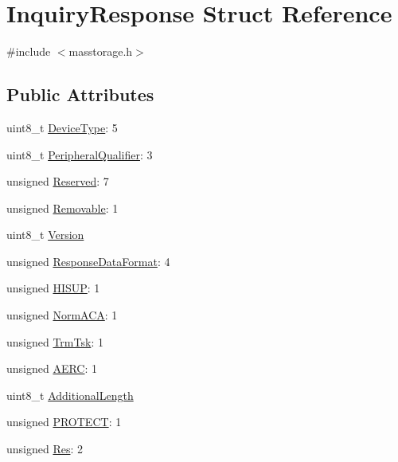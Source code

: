 \hypertarget{struct_inquiry_response}{\section{\-Inquiry\-Response \-Struct \-Reference}
\label{struct_inquiry_response}
}


{\ttfamily \#include $<$masstorage.\-h$>$}

\subsection*{\-Public \-Attributes}
\begin{DoxyCompactItemize}
\item 
uint8\-\_\-t \hyperlink{struct_inquiry_response_abc2af027a176dc85d4e83f14eec7972e}{\-Device\-Type}\-: 5
\item 
uint8\-\_\-t \hyperlink{struct_inquiry_response_a8e8f2cb6b5a0d1ed2c300155bf2b3faa}{\-Peripheral\-Qualifier}\-: 3
\item 
unsigned \hyperlink{struct_inquiry_response_abb4a48d4fc326ad932fb41c82fe289f3}{\-Reserved}\-: 7
\item 
unsigned \hyperlink{struct_inquiry_response_ab6572ef8e5cd457e0699095f6a0c7a3d}{\-Removable}\-: 1
\item 
uint8\-\_\-t \hyperlink{struct_inquiry_response_a86832a5def98c1e21447497177a8cc3a}{\-Version}
\item 
unsigned \hyperlink{struct_inquiry_response_a801e10546dedbd134568bef84f1b287a}{\-Response\-Data\-Format}\-: 4
\item 
unsigned \hyperlink{struct_inquiry_response_a64b542b21ee54739136235785563e036}{\-H\-I\-S\-U\-P}\-: 1
\item 
unsigned \hyperlink{struct_inquiry_response_a02cb9a4f4f1a080853eeb3fe3a97b6fe}{\-Norm\-A\-C\-A}\-: 1
\item 
unsigned \hyperlink{struct_inquiry_response_add4ccc2e5f626d29a24e5f38149a2e76}{\-Trm\-Tsk}\-: 1
\item 
unsigned \hyperlink{struct_inquiry_response_ad02da835cba8057f07b359903ee0c389}{\-A\-E\-R\-C}\-: 1
\item 
uint8\-\_\-t \hyperlink{struct_inquiry_response_abf1bb662cae5c4d2c2e4dbb454f92e91}{\-Additional\-Length}
\item 
unsigned \hyperlink{struct_inquiry_response_a0acb31c77f25be1d6e37c827147645af}{\-P\-R\-O\-T\-E\-C\-T}\-: 1
\item 
unsigned \hyperlink{struct_inquiry_response_a9f642c5fccc1c87cf6b444a138b6aa4b}{\-Res}\-: 2

\end{DoxyCompactItemize}
